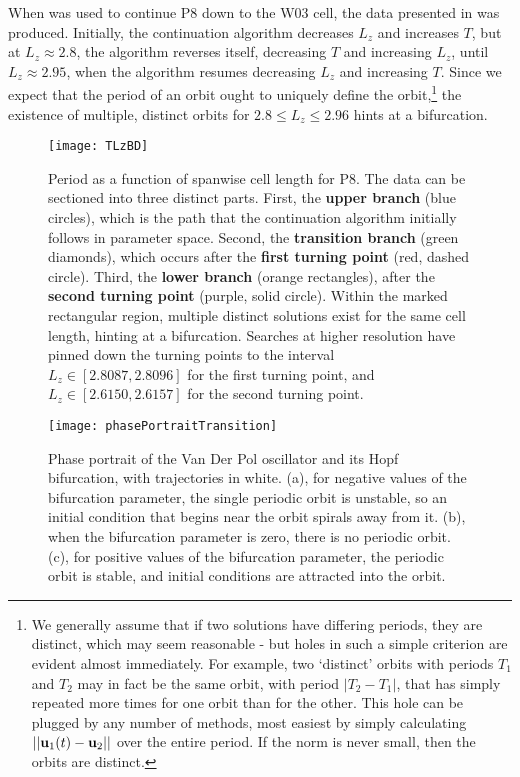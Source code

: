 When  was used to continue P8 down to the W03 cell, the data presented in  was produced.  Initially, the continuation algorithm decreases $L_z$ and increases $T$, but at $L_z \approx 2.8$, the algorithm reverses itself, decreasing $T$ and increasing $L_z$, until $L_z \approx 2.95$, when the algorithm resumes decreasing $L_z$ and increasing $T$. Since we expect that the period of an orbit ought to uniquely define the orbit,\footnote{We generally assume that if two solutions have differing periods, they are distinct, which may seem reasonable - but holes in such a simple criterion are evident almost immediately. For example, two `distinct' orbits with periods $T_1$ and $T_2$ may in fact be the same orbit, with period $|T_2-T_1|$, that has simply repeated more times for one orbit than for the other. This hole can be plugged by any number of methods, most easiest by simply calculating $||\mathbf{u}_1(t) - \mathbf{u}_2||$ over the entire period. If the norm is never small, then the orbits are distinct. }  the existence of multiple, distinct orbits for $2.8 \leq L_z \leq 2.96$ hints at a bifurcation. 
\begin{figure}[t]
\texttt{[image: TLzBD]}
\caption{Period as a function of spanwise cell length for P8. The data can be sectioned into three distinct parts. First, the {\bf upper branch} (blue circles), which is the path that the continuation algorithm initially follows in parameter space. Second, the {\bf transition branch} (green diamonds), which occurs after the {\bf first turning point} (red, dashed circle). Third, the {\bf lower branch} (orange rectangles), after the {\bf second turning point} (purple, solid circle). Within the marked rectangular region, multiple distinct solutions exist for the same cell length, hinting at a bifurcation. Searches at higher resolution have pinned down the turning points to the interval $L_z \in[2.8087, 2.8096]$ for the first turning point, and $L_z \in [2.6150,2.6157]$ for the second turning point.}\label{fig:LZBif}
\end{figure}
\begin{figure}[t]
\texttt{[image: phasePortraitTransition]}
\caption{Phase portrait of the Van Der Pol oscillator and its Hopf bifurcation, with trajectories in white. (a), for negative values of the bifurcation parameter, the single periodic orbit is unstable, so an initial condition that begins near the orbit spirals away from it. (b), when the bifurcation parameter is zero, there is no periodic orbit. (c), for positive values of the bifurcation parameter, the periodic orbit is stable, and initial conditions are attracted into the orbit.}\label{fig:phasePortrait}
\end{figure}
